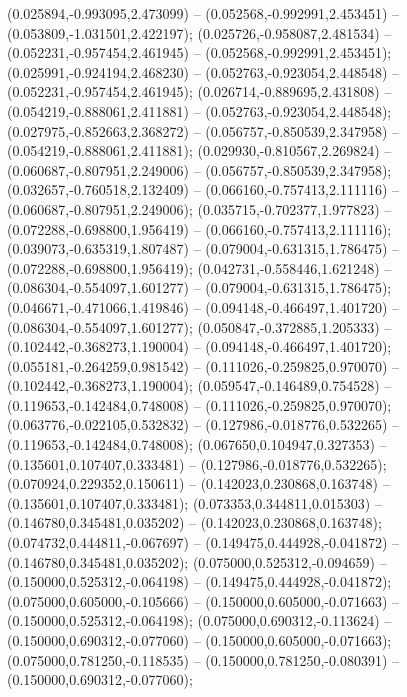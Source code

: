  (0.025894,-0.993095,2.473099) -- (0.052568,-0.992991,2.453451) -- (0.053809,-1.031501,2.422197);
 (0.025726,-0.958087,2.481534) -- (0.052231,-0.957454,2.461945) -- (0.052568,-0.992991,2.453451);
 (0.025991,-0.924194,2.468230) -- (0.052763,-0.923054,2.448548) -- (0.052231,-0.957454,2.461945);
 (0.026714,-0.889695,2.431808) -- (0.054219,-0.888061,2.411881) -- (0.052763,-0.923054,2.448548);
 (0.027975,-0.852663,2.368272) -- (0.056757,-0.850539,2.347958) -- (0.054219,-0.888061,2.411881);
 (0.029930,-0.810567,2.269824) -- (0.060687,-0.807951,2.249006) -- (0.056757,-0.850539,2.347958);
 (0.032657,-0.760518,2.132409) -- (0.066160,-0.757413,2.111116) -- (0.060687,-0.807951,2.249006);
 (0.035715,-0.702377,1.977823) -- (0.072288,-0.698800,1.956419) -- (0.066160,-0.757413,2.111116);
 (0.039073,-0.635319,1.807487) -- (0.079004,-0.631315,1.786475) -- (0.072288,-0.698800,1.956419);
 (0.042731,-0.558446,1.621248) -- (0.086304,-0.554097,1.601277) -- (0.079004,-0.631315,1.786475);
 (0.046671,-0.471066,1.419846) -- (0.094148,-0.466497,1.401720) -- (0.086304,-0.554097,1.601277);
 (0.050847,-0.372885,1.205333) -- (0.102442,-0.368273,1.190004) -- (0.094148,-0.466497,1.401720);
 (0.055181,-0.264259,0.981542) -- (0.111026,-0.259825,0.970070) -- (0.102442,-0.368273,1.190004);
 (0.059547,-0.146489,0.754528) -- (0.119653,-0.142484,0.748008) -- (0.111026,-0.259825,0.970070);
 (0.063776,-0.022105,0.532832) -- (0.127986,-0.018776,0.532265) -- (0.119653,-0.142484,0.748008);
 (0.067650,0.104947,0.327353) -- (0.135601,0.107407,0.333481) -- (0.127986,-0.018776,0.532265);
 (0.070924,0.229352,0.150611) -- (0.142023,0.230868,0.163748) -- (0.135601,0.107407,0.333481);
 (0.073353,0.344811,0.015303) -- (0.146780,0.345481,0.035202) -- (0.142023,0.230868,0.163748);
 (0.074732,0.444811,-0.067697) -- (0.149475,0.444928,-0.041872) -- (0.146780,0.345481,0.035202);
 (0.075000,0.525312,-0.094659) -- (0.150000,0.525312,-0.064198) -- (0.149475,0.444928,-0.041872);
 (0.075000,0.605000,-0.105666) -- (0.150000,0.605000,-0.071663) -- (0.150000,0.525312,-0.064198);
 (0.075000,0.690312,-0.113624) -- (0.150000,0.690312,-0.077060) -- (0.150000,0.605000,-0.071663);
 (0.075000,0.781250,-0.118535) -- (0.150000,0.781250,-0.080391) -- (0.150000,0.690312,-0.077060);
